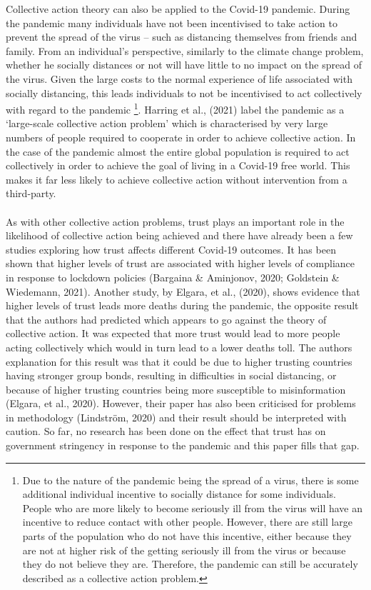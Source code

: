 \documentclass[
  11pt,
]{article}
\begin{document}
Collective action theory can also be applied to the Covid-19 pandemic. During the pandemic many individuals have not been incentivised to take action to prevent the spread of the virus -- such as distancing themselves from friends and family. From an individual's perspective, similarly to the climate change problem, whether he socially distances or not will have little to no impact on the spread of the virus. Given the large costs to the normal experience of life associated with socially distancing, this leads individuals to not be incentivised to act collectively with regard to the pandemic \footnote{Due to the nature of the pandemic being the spread of a virus, there is some additional individual incentive to socially distance for some individuals. People who are more likely to become seriously ill from the virus will have an incentive to reduce contact with other people. However, there are still large parts of the population who do not have this incentive, either because they are not at higher risk of the getting seriously ill from the virus or because they do not believe they are. Therefore, the pandemic can still be accurately described as a collective action problem.}. Harring et al., (2021) label the pandemic as a `large-scale collective action problem' which is characterised by very large numbers of people required to cooperate in order to achieve collective action. In the case of the pandemic almost the entire global population is required to act collectively in order to achieve the goal of living in a Covid-19 free world. This makes it far less likely to achieve collective action without intervention from a third-party.\\
~\\
As with other collective action problems, trust plays an important role in the likelihood of collective action being achieved and there have already been a few studies exploring how trust affects different Covid-19 outcomes. It has been shown that higher levels of trust are associated with higher levels of compliance in response to lockdown policies (Bargaina \& Aminjonov, 2020; Goldstein \& Wiedemann, 2021). Another study, by Elgara, et al., (2020), shows evidence that higher levels of trust leads more deaths during the pandemic, the opposite result that the authors had predicted which appears to go against the theory of collective action. It was expected that more trust would lead to more people acting collectively which would in turn lead to a lower deaths toll. The authors explanation for this result was that it could be due to higher trusting countries having stronger group bonds, resulting in difficulties in social distancing, or because of higher trusting countries being more susceptible to misinformation (Elgara, et al., 2020). However, their paper has also been criticised for problems in methodology (Lindström, 2020) and their result should be interpreted with caution. So far, no research has been done on the effect that trust has on government stringency in response to the pandemic and this paper fills that gap.\\
\end{document}
